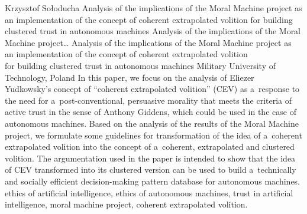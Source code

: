 \begin{artengenv}{Krzysztof Sołoducha}
	{Analysis of the implications of the Moral Machine project as an implementation of the concept of coherent extrapolated volition for building clustered trust in autonomous machines}
	{Analysis of the implications of the Moral Machine project\ldots}
	{Analysis of the implications of the Moral Machine project as\\an implementation of the concept of coherent extrapolated volition\\for building clustered trust in autonomous machines}
	{Military University of Technology, Poland}
	{In this paper, we focus on the analysis of Eliezer Yudkowsky's concept of ``coherent extrapolated volition'' (CEV) as a~response to the need for a~post-conventional, persuasive morality that meets the criteria of active trust in the sense of Anthony Giddens, which could be used in the case of autonomous machines. Based on the analysis of the results of the Moral Machine project, we formulate some guidelines for transformation of the idea of a~coherent extrapolated volition into the concept of a~coherent, extrapolated and clustered volition. The argumentation used in the paper is intended to show that the idea of CEV transformed into its clustered version can be used to build a~technically and socially efficient decision-making pattern database for autonomous machines.
	}
	{ethics of artificial intelligence, ethics of autonomous machines, trust in artificial intelligence, moral machine project, coherent extrapolated volition.}
	

\end{artengenv}
